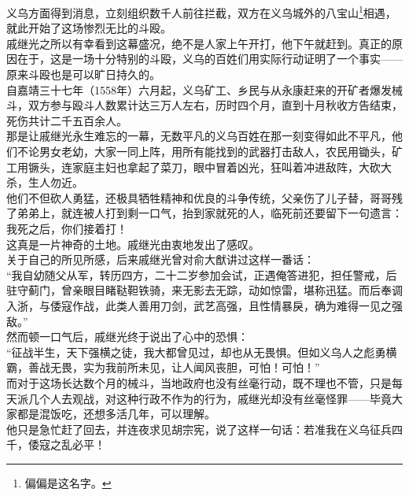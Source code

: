 \begin{multicols}{\theparacolNo}
义乌方面得到消息，立刻组织数千人前往拦截，双方在义乌城外的八宝山\footnote{偏偏是这名字。}相遇，就此开始了这场惨烈无比的斗殴。\\

戚继光之所以有幸看到这幕盛况，绝不是人家上午开打，他下午就赶到。真正的原因在于，这是一场十分特别的斗殴，义乌的百姓们用实际行动证明了一个事实——原来斗殴也是可以旷日持久的。\\

自嘉靖三十七年（1558年）六月起，义乌矿工、乡民与从永康赶来的开矿者爆发械斗，双方参与殴斗人数累计达三万人左右，历时四个月，直到十月秋收方告结束，死伤共计二千五百余人。\\

那是让戚继光永生难忘的一幕，无数平凡的义乌百姓在那一刻变得如此不平凡，他们不论男女老幼，大家一同上阵，用所有能找到的武器打击敌人，农民用锄头，矿工用镢头，连家庭主妇也拿起了菜刀，眼中冒着凶光，狂叫着冲进敌阵，大砍大杀，生人勿近。\\

他们不但砍人勇猛，还极具牺牲精神和优良的斗争传统，父亲伤了儿子替，哥哥残了弟弟上，就连被人打到剩一口气，抬到家就死的人，临死前还要留下一句遗言：我死之后，你们接着打！\\

这真是一片神奇的土地。戚继光由衷地发出了感叹。\\

关于自己的所见所感，后来戚继光曾对俞大猷讲过这样一番话：\\

“我自幼随父从军，转历四方，二十二岁参加会试，正遇俺答进犯，担任警戒，后驻守蓟门，曾亲眼目睹鞑靼铁骑，来无影去无踪，动如惊雷，堪称迅猛。而后奉调入浙，与倭寇作战，此类人善用刀剑，武艺高强，且性情暴戾，确为难得一见之强敌。”\\

然而顿一口气后，戚继光终于说出了心中的恐惧：\\

“征战半生，天下强横之徒，我大都曾见过，却也从无畏惧。但如义乌人之彪勇横霸，善战无畏，实为我前所未见，让人闻风丧胆，可怕！可怕！”\\

而对于这场长达数个月的械斗，当地政府也没有丝毫行动，既不理也不管，只是每天派几个人去观战，对这种行政不作为的行为，戚继光却没有丝毫怪罪——毕竟大家都是混饭吃，还想多活几年，可以理解。\\

他只是急忙赶了回去，并连夜求见胡宗宪，说了这样一句话：若准我在义乌征兵四千，倭寇之乱必平！\\


\end{multicols}
